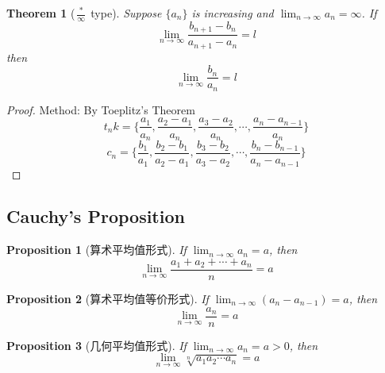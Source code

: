 \documentclass[onecolumn]{ctexart}
\newtheorem{theorem}{Theorem}
\newtheorem{proposition}{Proposition}
\begin{document}
\begin{theorem}[$\frac{*}{\infty}$ type]
  Suppose $\{a_n\}$ is increasing and $\lim_{n \to \infty} a_n = \infty$. If
  \[
    \lim_{n \to \infty} \frac{b_{n+1} - b_n}{a_{n+1} - a_n} = l
  \]
  then
  \[
    \lim_{n \to \infty} \frac{b_n}{a_n} = l   
  \]
\end{theorem}

\begin{proof}
  Method: By Toeplitz's Theorem
  \[
    t_nk = \{\frac{a_1}{a_n}, \frac{a_2 - a_1}{a_n}, \frac{a_3 - a_2}{a_n}, \cdots, \frac{a_n - a_{n-1}}{a_n}\}
  \]
  \[
    c_n = \{\frac{b_1}{a_1}, \frac{b_2 - b_1}{a_2 - a_1}, \frac{b_3 - b_2}{a_3 - a_2}, \cdots, \frac{b_n - b_{n-1}}{a_n - a_{n-1}}\}
  \]
\end{proof}

\subsection{Cauchy's Proposition}

\begin{proposition}[算术平均值形式]
  If $\lim_{n \to \infty} a_n = a$, then
  \[
    \lim_{n \to \infty} \frac{a_1 + a_2 + \cdots + a_n}{n} = a
  \]
\end{proposition}

\begin{proposition}[算术平均值等价形式]
  If $\lim_{n \to \infty} (a_n - a_{n-1}) = a$, then
  \[
    \lim_{n \to \infty} \frac{a_n}{n} = a
  \]
\end{proposition}

\begin{proposition}[几何平均值形式]
  If $\lim_{n \to \infty} a_n = a > 0$, then
  \[
    \lim_{n \to \infty} \sqrt[n]{a_1 a_2 \cdots a_n} = a
  \]
\end{proposition}
\end{document}
